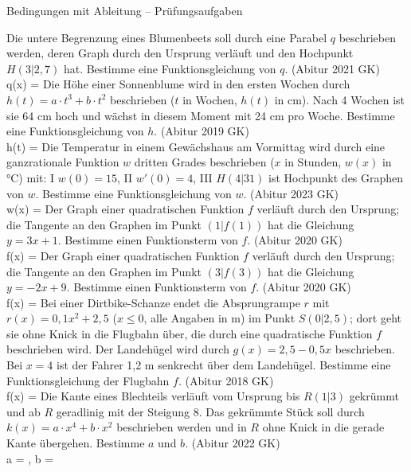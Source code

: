 \begin{aufgabe}{Bedingungen mit Ableitung – Prüfungsaufgaben}
\begin{teile}
\teil Die untere Begrenzung eines Blumenbeets soll durch eine Parabel $q$ beschrieben werden, deren Graph durch den Ursprung verläuft und den Hochpunkt $H(3|2{,}7)$ hat. Bestimme eine Funktionsgleichung von $q$. \hfill (Abitur 2021 GK) \\ q(x) = \leerfeld
\teil Die Höhe einer Sonnenblume wird in den ersten Wochen durch $h(t) = a \cdot t^3 + b \cdot t^2$ beschrieben ($t$ in Wochen, $h(t)$ in cm). Nach 4 Wochen ist sie 64 cm hoch und wächst in diesem Moment mit 24 cm pro Woche. Bestimme eine Funktionsgleichung von $h$. \hfill (Abitur 2019 GK) \\ h(t) = \leerfeld
\teil Die Temperatur in einem Gewächshaus am Vormittag wird durch eine ganzrationale Funktion $w$ dritten Grades beschrieben ($x$ in Stunden, $w(x)$ in °C) mit: I $w(0) = 15$, II $w'(0) = 4$, III $H(4|31)$ ist Hochpunkt des Graphen von $w$. Bestimme eine Funktionsgleichung von $w$. \hfill (Abitur 2023 GK) \\ w(x) = \leerfeld
\teil Der Graph einer quadratischen Funktion $f$ verläuft durch den Ursprung; die Tangente an den Graphen im Punkt $(1|f(1))$ hat die Gleichung $y = 3x + 1$. Bestimme einen Funktionsterm von $f$. \hfill (Abitur 2020 GK) \\ f(x) = \leerfeld
\teil Der Graph einer quadratischen Funktion $f$ verläuft durch den Ursprung; die Tangente an den Graphen im Punkt $(3|f(3))$ hat die Gleichung $y = -2x + 9$. Bestimme einen Funktionsterm von $f$. \hfill (Abitur 2020 GK) \\ f(x) = \leerfeld
\teil Bei einer Dirtbike-Schanze endet die Absprungrampe $r$ mit $r(x) = 0{,}1x^2 + 2{,}5$ ($x \le 0$, alle Angaben in m) im Punkt $S(0|2{,}5)$; dort geht sie ohne Knick in die Flugbahn über, die durch eine quadratische Funktion $f$ beschrieben wird. Der Landehügel wird durch $g(x) = 2{,}5 - 0{,}5x$ beschrieben. Bei $x = 4$ ist der Fahrer 1,2 m senkrecht über dem Landehügel. Bestimme eine Funktionsgleichung der Flugbahn $f$. \hfill (Abitur 2018 GK) \\ f(x) = \leerfeld
\teil Die Kante eines Blechteils verläuft vom Ursprung bis $R(1|3)$ gekrümmt und ab $R$ geradlinig mit der Steigung 8. Das gekrümmte Stück soll durch $k(x) = a \cdot x^4 + b \cdot x^2$ beschrieben werden und in $R$ ohne Knick in die gerade Kante übergehen. Bestimme $a$ und $b$. \hfill (Abitur 2022 GK) \\ a = \leerfeld , b = \leerfeld
\end{teile}
\end{aufgabe}

